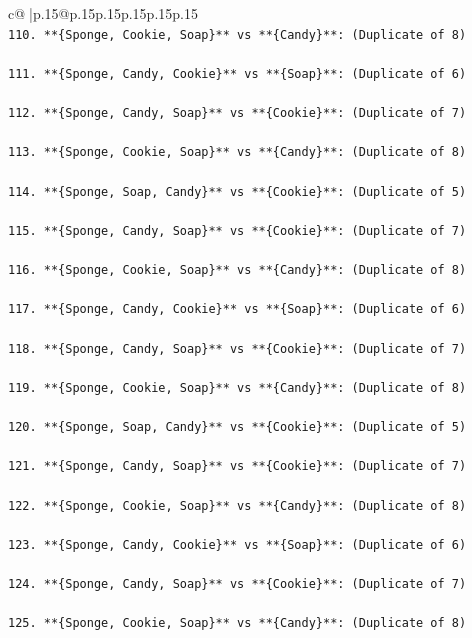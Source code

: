 \documentclass{article}
\begin{document}
{\begin{supertabular}{c@{$\;$}|p{.15\linewidth}@{}p{.15\linewidth}p{.15\linewidth}p{.15\linewidth}p{.15\linewidth}p{.15\linewidth}}
{{{\\ 
\texttt{110. **\{Sponge, Cookie, Soap\}** vs **\{Candy\}**: (Duplicate of 8)} \\
\\ 
\texttt{111. **\{Sponge, Candy, Cookie\}** vs **\{Soap\}**: (Duplicate of 6)} \\
\\ 
\texttt{112. **\{Sponge, Candy, Soap\}** vs **\{Cookie\}**: (Duplicate of 7)} \\
\\ 
\texttt{113. **\{Sponge, Cookie, Soap\}** vs **\{Candy\}**: (Duplicate of 8)} \\
\\ 
\texttt{114. **\{Sponge, Soap, Candy\}** vs **\{Cookie\}**: (Duplicate of 5)} \\
\\ 
\texttt{115. **\{Sponge, Candy, Soap\}** vs **\{Cookie\}**: (Duplicate of 7)} \\
\\ 
\texttt{116. **\{Sponge, Cookie, Soap\}** vs **\{Candy\}**: (Duplicate of 8)} \\
\\ 
\texttt{117. **\{Sponge, Candy, Cookie\}** vs **\{Soap\}**: (Duplicate of 6)} \\
\\ 
\texttt{118. **\{Sponge, Candy, Soap\}** vs **\{Cookie\}**: (Duplicate of 7)} \\
\\ 
\texttt{119. **\{Sponge, Cookie, Soap\}** vs **\{Candy\}**: (Duplicate of 8)} \\
\\ 
\texttt{120. **\{Sponge, Soap, Candy\}** vs **\{Cookie\}**: (Duplicate of 5)} \\
\\ 
\texttt{121. **\{Sponge, Candy, Soap\}** vs **\{Cookie\}**: (Duplicate of 7)} \\
\\ 
\texttt{122. **\{Sponge, Cookie, Soap\}** vs **\{Candy\}**: (Duplicate of 8)} \\
\\ 
\texttt{123. **\{Sponge, Candy, Cookie\}** vs **\{Soap\}**: (Duplicate of 6)} \\
\\ 
\texttt{124. **\{Sponge, Candy, Soap\}** vs **\{Cookie\}**: (Duplicate of 7)} \\
\\ 
\texttt{125. **\{Sponge, Cookie, Soap\}** vs **\{Candy\}**: (Duplicate of 8)} \\
}}}
\end{supertabular}}
\end{document}
